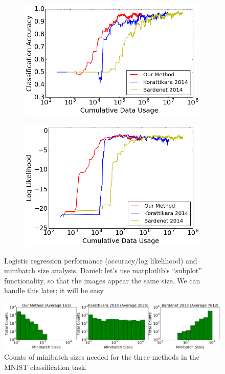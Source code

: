 \documentclass{article}
\begin{document}
\begin{figure}[t]
    \centering
    \begin{subfigure}{.4\textwidth}
     \centering
     \includegraphics[width=1\linewidth]{LogisticRegressionResult/acc_logistic}
    \end{subfigure}
    \begin{subfigure}{.4\textwidth}
     \centering
    \includegraphics[width=1\linewidth]{LogisticRegressionResult/ll_logistic}
\end{subfigure}
\caption{
    Logistic regression performance (accuracy/log likelihood) and minibatch size
    analysis. {\color{blue} Daniel: let's use matplotlib's ``subplot''
    functionality, so that the images appear the same size. We can handle this
    later; it will be easy.}
    }
\label{fig:logistic_fig}
\end{figure}

\begin{figure}[t]
	\centering
	\includegraphics[width=1\linewidth]{LogisticRegressionResult/minibatch_size_logistic.png}
	\caption{
    Counts of minibatch sizes needed for the three methods in the MNIST
    classification task.
    }
	\label{fig:logistic_minibatch}
\end{figure}
\end{document}
